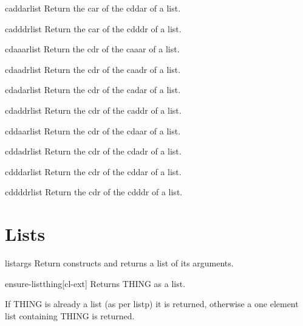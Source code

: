 \documentclass[10pt,english]{book}
\begin{document}
\begin{accessor}{caddar}{list}
  Return the car of the cddar of a list.
\end{accessor}

\begin{accessor}{cadddr}{list}
  Return the car of the cdddr of a list.
\end{accessor}

\begin{accessor}{cdaaar}{list}
  Return the cdr of the caaar of a list.
\end{accessor}

\begin{accessor}{cdaadr}{list}
  Return the cdr of the caadr of a list.
\end{accessor}

\begin{accessor}{cdadar}{list}
  Return the cdr of the cadar of a list.
\end{accessor}

\begin{accessor}{cdaddr}{list}
  Return the cdr of the caddr of a list.
\end{accessor}

\begin{accessor}{cddaar}{list}
  Return the cdr of the cdaar of a list.
\end{accessor}

\begin{accessor}{cddadr}{list}
  Return the cdr of the cdadr of a list.
\end{accessor}

\begin{accessor}{cdddar}{list}
  Return the cdr of the cddar of a list.
\end{accessor}

\begin{accessor}{cddddr}{list}
  Return the cdr of the cdddr of a list.
\end{accessor}

\section{Lists}
\label{sec:lists}

\begin{function}{list}{\rest args}
  Return constructs and returns a list of its arguments.
\end{function}

\begin{function}{ensure-list}{thing}[cl-ext]
  Returns THING as a list.

If THING is already a list (as per listp) it is returned,
otherwise a one element list containing THING is returned.
\end{function}
\end{document}
